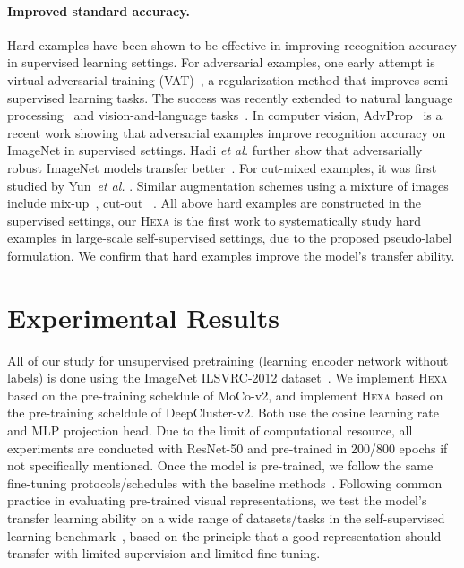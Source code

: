 \documentclass[10pt,twocolumn,letterpaper]{article}
\newcommand{\ea}[0]{\emph{et al. }}
\newcommand{\shortname}{\textsc{Hexa}}
\begin{document}
\paragraph{Improved standard accuracy.} 
Hard examples have been shown to be effective in improving recognition accuracy in supervised learning settings.
For adversarial examples, one early attempt is virtual adversarial training (VAT)~\cite{miyato2018virtual}, a regularization method that improves semi-supervised learning tasks. The success was recently extended to natural language processing~\cite{wang2019improving,cheng2019robust,liu2020adversarial} and  vision-and-language tasks~\cite{gan2020large}. In computer vision, AdvProp~\cite{xie2020adversarial} is a recent work showing that  adversarial examples improve recognition accuracy on ImageNet in supervised settings. Hadi \ea further show that adversarially robust ImageNet models transfer better~\cite{salman2020adversarially}. For cut-mixed examples, it was first studied by Yun~\ea\cite{yun2019cutmix}. Similar augmentation schemes using a mixture of images include mix-up~\cite{zhang2017mixup}, cut-out~\cite{devries2017improved} \etc.
All above hard examples are constructed in the supervised settings, our \shortname{} is the first work to systematically study hard examples in large-scale self-supervised settings, due to the proposed pseudo-label formulation.  We confirm that hard examples improve the model's transfer ability. 


\section{Experimental Results}



All of our study for unsupervised
pretraining (learning encoder network  without labels)
is done using the ImageNet ILSVRC-2012 dataset~\cite{deng2009imagenet}. 
We implement \shortname{} based on the pre-training scheldule of MoCo-v2, and  implement \shortname{} based on the pre-training scheldule of DeepCluster-v2. Both use the cosine learning rate and MLP projection head. Due to the limit of computational resource, all experiments are conducted with ResNet-50 and pre-trained in 200/800 epochs if not specifically mentioned. 
Once the model is pre-trained, we follow the same fine-tuning protocols/schedules with the baseline methods~\cite{he2020momentum,caron2020unsupervised}.
Following common practice in evaluating pre-trained visual representations, we test the model's transfer learning ability on a wide range of datasets/tasks in the self-supervised learning benchmark~\cite{goyal2019scaling}, based on the principle that a good representation should transfer with limited supervision
and limited fine-tuning.
\end{document}
